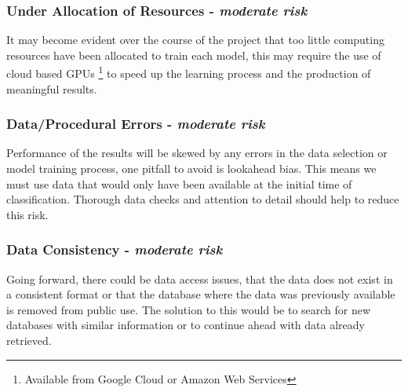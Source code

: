\documentclass[11pt]{article}
\begin{document}
\subsubsection{Under Allocation of Resources - \textit{moderate risk}}
It may become evident over the course of the project that too little computing resources have been allocated to train each model, this may require the use of cloud based GPUs \footnote{Available from Google Cloud or Amazon Web Services} to speed up the learning process and the production of meaningful results. 

\subsubsection{Data/Procedural Errors - \textit{moderate risk}}
Performance of the results will be skewed by any errors in the data selection or model training process, one pitfall to avoid is lookahead bias. This means we must use data that would only have been available at the initial time of classification. Thorough data checks and attention to detail should help to reduce this risk.

\subsubsection{Data Consistency - \textit{moderate risk}}
Going forward, there could be data access issues, that the data does not exist in a consistent format or that the database where the data was previously available is removed from public use. The solution to this would be to search for new databases with similar information or to continue ahead with data already retrieved. 

\clearpage

{}
\clearpage
\end{document}
